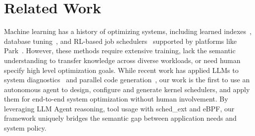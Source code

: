 \section{Related Work}
\label{sec:related}

Machine learning has a history of optimizing systems, including learned indexes~\cite{kraska2018learned}, database tuning~\cite{marcus2019neo,vanaken2017ottertune}, and RL-based job schedulers~\cite{mao2019decima,qiu2020firm,zhang2024mrsch} supported by platforms like Park~\cite{mao2019park}. However, these methods require extensive training, lack the semantic understanding to transfer knowledge across diverse workloads, or need human specify high level optimization goals. While recent work has applied LLMs to system diagnostics~\cite{wang2024llmsys} and parallel code generation~\cite{wei2024mapper}, our work is the first to use an autonomous agent to design, configure and generate kernel schedulers, and apply them for end-to-end system optimization without human involvement. By leveraging LLM Agent reasoning, tool usage with sched\_ext and eBPF, our framework uniquely bridges the semantic gap between application needs and system policy.

